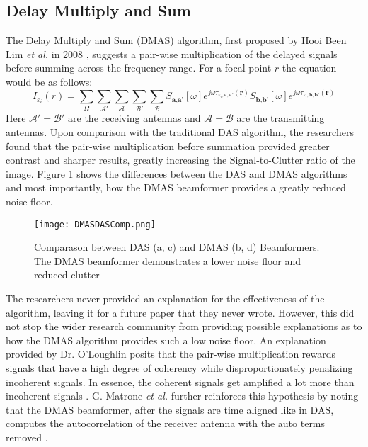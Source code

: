 \subsection{Delay Multiply and Sum}
The Delay Multiply and Sum (DMAS) algorithm, first proposed by Hooi Been Lim \textit{et al.} in 2008
\cite{h.beenlimConfocalMicrowaveImaging2008}, suggests a pair-wise multiplication of the delayed signals before summing
across the frequency range. For a focal point $r$ the equation would be as follows:
\begingroup
\large
\begin{equation}
    I_{\varepsilon_i}(r) = \sum_{\Omega}\sum_{\mathcal{A}'}\sum_{\mathcal{A}}\sum_{\mathcal{B}'}\sum_{\mathcal{B}} S_{\textbf{a}, \textbf{a'}}[\omega]e^{j\omega \tau_{\varepsilon_i, \textbf{a}, \textbf{a'}}(\textbf{r})} S_{\textbf{b}, \textbf{b'}}[\omega]e^{j\omega \tau_{\varepsilon_i, \textbf{b}, \textbf{b'}}(\textbf{r})}
    \label{eq:DMASBeamformer}
\end{equation}
\endgroup
Here $\mathcal{A}' = \mathcal{B}'$ are the receiving antennas and $\mathcal{A} = \mathcal{B}$ are the transmitting
antennas. Upon comparison with the traditional DAS algorithm, the researchers found that the pair-wise multiplication
before summation provided greater contrast and sharper results, greatly increasing the Signal-to-Clutter ratio of the
image. Figure \ref{fig:DMASDASComp} shows the differences between the DAS and DMAS algorithms and most
importantly, how the DMAS beamformer provides a greatly reduced noise floor.
\begin{figure}[!h]
    \texttt{[image: DMASDASComp.png]}
    \centering
    \caption{Comparason between DAS (a, c) and DMAS (b, d) Beamformers. The DMAS beamformer demonstrates a lower noise floor and reduced clutter}
    \label{fig:DMASDASComp}
\end{figure}
The researchers never provided an explanation for the effectiveness of the algorithm, leaving it for a future
paper that they never wrote. However, this did not stop the wider research community from providing possible
explanations as to how the DMAS algorithm provides such a low noise floor. An explanation provided by Dr. O'Loughlin
posits that the pair-wise multiplication rewards signals that have a high degree of coherency while disproportionately
penalizing incoherent signals. In essence, the coherent signals get amplified a lot more than incoherent signals
\cite{oloughlinComparingRadarBasedBreast2019}. G. Matrone \textit{et al.} further reinforces this hypothesis by noting that the DMAS beamformer,
after the signals are time aligned like in DAS, computes the autocorrelation of the receiver antenna with the auto
terms removed \cite{g.matroneDelayMultiplySum2015}.

